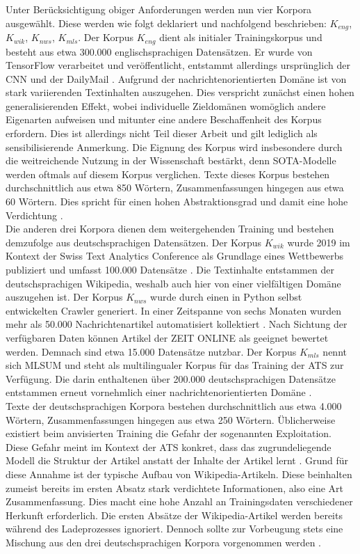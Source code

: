 \noindent
Unter Berücksichtigung obiger Anforderungen werden nun vier Korpora ausgewählt. Diese werden wie folgt deklariert und nachfolgend beschrieben: $K_{eng}$, $K_{wik}$, $K_{nws}$, $K_{mls}$. Der Korpus $K_{eng}$ dient als initialer Trainingskorpus und besteht aus etwa 300.000 englischsprachigen Datensätzen. Er wurde von TensorFlow verarbeitet und veröffentlicht, entstammt allerdings ursprünglich der CNN und der DailyMail \cite{TEN21}. Aufgrund der nachrichtenorientierten Domäne ist von stark variierenden Textinhalten auszugehen. Dies verspricht zunächst einen hohen generalisierenden Effekt, wobei individuelle Zieldomänen womöglich andere Eigenarten aufweisen und mitunter eine andere Beschaffenheit des Korpus erfordern. Dies ist allerdings nicht Teil dieser Arbeit und gilt lediglich als sensibilisierende Anmerkung. Die Eignung des Korpus wird insbesondere durch die weitreichende Nutzung in der Wissenschaft bestärkt, denn \ac{SOTA}-Modelle werden oftmals auf diesem Korpus verglichen. Texte dieses Korpus bestehen durchschnittlich aus etwa 850 Wörtern, Zusammenfassungen hingegen aus etwa 60 Wörtern. Dies spricht für einen hohen Abstraktionsgrad und damit eine hohe Verdichtung \cite[S.~6]{ROT20}.\\

\noindent
Die anderen drei Korpora dienen dem weitergehenden Training und bestehen demzufolge aus deutschsprachigen Datensätzen. Der Korpus $K_{wik}$ wurde 2019 im Kontext der Swiss Text Analytics Conference als Grundlage eines Wettbewerbs publiziert und umfasst 100.000 Datensätze \cite{CIE19}. Die Textinhalte entstammen der deutschsprachigen Wikipedia, weshalb auch hier von einer vielfältigen Domäne auszugehen ist. Der Korpus $K_{nws}$ wurde durch einen in Python selbst entwickelten Crawler generiert. In einer Zeitspanne von sechs Monaten wurden mehr als 50.000 Nachrichtenartikel automatisiert kollektiert \cite[S.~79,~83,~416]{BIR09}. Nach Sichtung der verfügbaren Daten können Artikel der ZEIT ONLINE als geeignet bewertet werden. Demnach sind etwa 15.000 Datensätze nutzbar. Der Korpus $K_{mls}$ nennt sich MLSUM und steht als multilingualer Korpus für das Training der \ac{ATS} zur Verfügung. Die darin enthaltenen über 200.000 deutschsprachigen Datensätze entstammen erneut vornehmlich einer nachrichtenorientierten Domäne \cite{SCI20}.\\

\noindent
Texte der deutschsprachigen Korpora bestehen durchschnittlich aus etwa 4.000 Wörtern, Zusammenfassungen hingegen aus etwa 250 Wörtern. Üblicherweise existiert beim anvisierten Training die Gefahr der sogenannten Exploitation. Diese Gefahr meint im Kontext der \ac{ATS} konkret, dass das zugrundeliegende Modell die Struktur der Artikel anstatt der Inhalte der Artikel lernt \cite[S.~476]{GOO16}. Grund für diese Annahme ist der typische Aufbau von Wikipedia-Artikeln. Diese beinhalten zumeist bereits im ersten Absatz stark verdichtete Informationen, also eine Art Zusammenfassung. Dies macht eine hohe Anzahl an Trainingsdaten verschiedener Herkunft erforderlich. Die ersten Absätze der Wikipedia-Artikel werden bereits während des Ladeprozesses ignoriert. Dennoch sollte zur Vorbeugung stets eine Mischung aus den drei deutschsprachigen Korpora vorgenommen werden \cite[S.~42]{BIR09}.
\newpage

